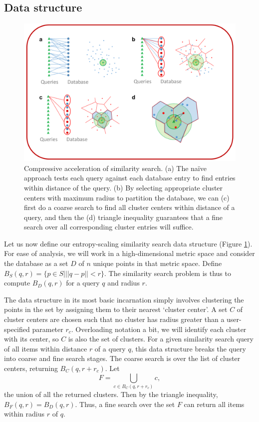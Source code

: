 \documentclass{amsbook}
\theoremstyle{definition}
\theoremstyle{remark}
\numberwithin{equation}{section}
\begin{document}
\subsection{Data structure}
\begin{figure}[btp]
    \centering
    \includegraphics[width=1\textwidth]{assets/dataStructure}
    \caption{ Compressive acceleration of similarity search. %
            (a) The naïve approach tests each query against each database entry to find entries within distance  of the query. %
            (b) By selecting appropriate cluster centers with maximum radius  to partition the database, we can (c) first do a coarse search to find all cluster centers within distance  of a query, and then the (d) triangle inequality guarantees that a fine search over all corresponding cluster entries will suffice.}
    \label{fig:dataStructure}
\end{figure}

Let us now define our entropy-scaling similarity search data structure (Figure \ref{fig:dataStructure}).
For ease of analysis, we will work in a high-dimensional metric space and consider the database as a set $D$ of $n$ unique points in that metric space.
Define $B_S(q,r) = \{ p \in S | ||q-p||<r \}$. The similarity search problem is thus to compute $B_D(q,r)$ for a query $q$ and radius $r$.

The data structure in its most basic incarnation simply involves clustering the points in the set by assigning them to their nearest `cluster center'.
A set $C$ of cluster centers are chosen such that no cluster has radius greater than a user-specified parameter $r_c$.
Overloading notation a bit, we will identify each cluster with its center, so $C$ is also the set of clusters.
For a given similarity search query of all items within distance $r$ of a query $q$, this data structure breaks the query into coarse and fine search stages.
The coarse search is over the list of cluster centers, returning $B_C(q,r + r_c)$.
Let \[\displaystyle F = \bigcup_{c \in B_C(q,r+r_c)} c , \] the union of all the returned clusters.
Then by the triangle inequality, $B_F(q,r) = B_D(q,r)$.
Thus, a fine search over the set $F$ can return all items within radius $r$ of $q$.
\end{document}
